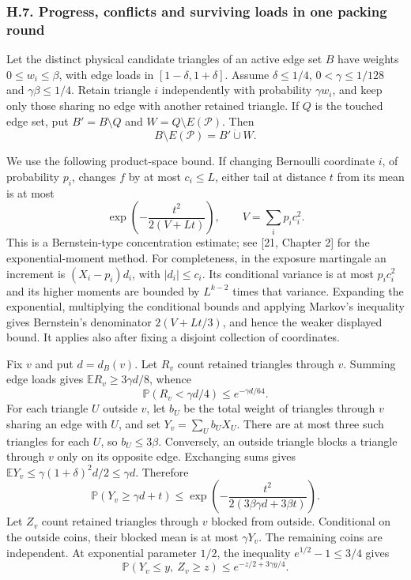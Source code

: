 \documentclass[english,11pt,a4paper]{article}
\begin{document}
\subsubsection{H.7. Progress, conflicts and surviving loads in one packing round}\label{h.7.-progress-conflicts-and-surviving-loads-in-one-packing-round}

Let the distinct physical candidate triangles of an active edge set \(B\) have weights \(0\le w_i\le\beta\), with edge loads in \([1-\delta,1+\delta]\). Assume \(\delta\le1/4\), \(0<\gamma\le1/128\) and \(\gamma\beta\le1/4\). Retain triangle \(i\) independently with probability \(\gamma w_i\), and keep only those sharing no edge with another retained triangle. If \(Q\) is the touched edge set, put \(B'=B\setminus Q\) and \(W=Q\setminus E(\mathcal P)\). Then \[B\setminus E(\mathcal P)=B'\mathbin{\dot\cup}W.\]

We use the following product-space bound. If changing Bernoulli coordinate \(i\), of probability \(p_i\), changes \(f\) by at most \(c_i\le L\), either tail at distance \(t\) from its mean is at most \[\exp\left(-\frac{t^2}{2(V+Lt)}\right),\qquad V=\sum_i p_ic_i^2.\] This is a Bernstein-type concentration estimate; see {[}21, Chapter 2{]} for the exponential-moment method. For completeness, in the exposure martingale an increment is \((X_i-p_i)d_i\), with \(|d_i|\le c_i\). Its conditional variance is at most \(p_ic_i^2\) and its higher moments are bounded by \(L^{k-2}\) times that variance. Expanding the exponential, multiplying the conditional bounds and applying Markov's inequality gives Bernstein's denominator \(2(V+Lt/3)\), and hence the weaker displayed bound. It applies also after fixing a disjoint collection of coordinates.

Fix \(v\) and put \(d=d_B(v)\). Let \(R_v\) count retained triangles through \(v\). Summing edge loads gives \(\mathbb ER_v\ge3\gamma d/8\), whence \[\mathbb P(R_v<\gamma d/4)\le e^{-\gamma d/64}.\] For each triangle \(U\) outside \(v\), let \(b_U\) be the total weight of triangles through \(v\) sharing an edge with \(U\), and set \(Y_v=\sum_U b_UX_U\). There are at most three such triangles for each \(U\), so \(b_U\le3\beta\). Conversely, an outside triangle blocks a triangle through \(v\) only on its opposite edge. Exchanging sums gives \(\mathbb EY_v\le\gamma(1+\delta)^2d/2\le\gamma d\). Therefore \[\mathbb P(Y_v\ge\gamma d+t)
\le\exp\left(-\frac{t^2}{2(3\beta\gamma d+3\beta t)}\right).\] Let \(Z_v\) count retained triangles through \(v\) blocked from outside. Conditional on the outside coins, their blocked mean is at most \(\gamma Y_v\). The remaining coins are independent. At exponential parameter \(1/2\), the inequality \(e^{1/2}-1\le3/4\) gives \[\mathbb P(Y_v\le y,\ Z_v\ge z)\le e^{-z/2+3\gamma y/4}.\]
\end{document}
